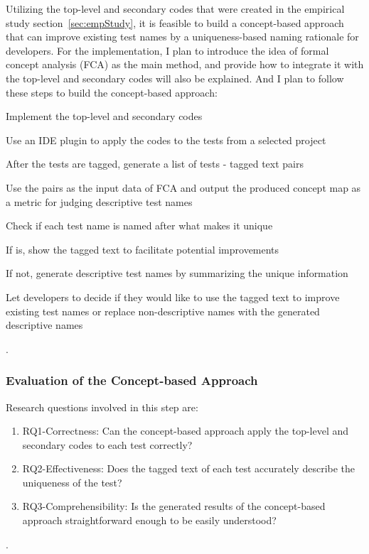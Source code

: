 Utilizing the top-level and secondary codes that were created in the empirical study section~\cref{sec:empStudy}, it is feasible to build a concept-based approach that can improve existing test names by a uniqueness-based naming rationale for developers.
%
For the implementation, I plan to introduce the idea of formal concept analysis (FCA) as the main method, and provide how to integrate it with the top-level and secondary codes will also be explained.
%
And I plan to follow these steps to build the concept-based approach:
\begin{enumerate*}
    \item Implement the top-level and secondary codes
    \item Use an IDE plugin to apply the codes to the tests from a selected project
    \item After the tests are tagged, generate a list of tests - tagged text pairs
    \item Use the pairs as the input data of FCA and output the produced concept map as a metric for judging descriptive test names
    \item Check if each test name is named after what makes it unique
    \item If is, show the tagged text to facilitate potential improvements
    \item If not, generate descriptive test names by summarizing the unique information
    \item Let developers to decide if they would like to use the tagged text to improve existing test names or replace non-descriptive names with the generated descriptive names
\end{enumerate*}.



\subsubsection{Evaluation of the Concept-based Approach}

Research questions involved in this step are:
%
\begin{enumerate}
    \item RQ1-Correctness: Can the concept-based approach apply the top-level and secondary codes to each test correctly?
    \item RQ2-Effectiveness: Does the tagged text of each test accurately describe the uniqueness of the test?
    \item RQ3-Comprehensibility: Is the generated results of the concept-based approach straightforward enough to be easily understood?
\end{enumerate}.

